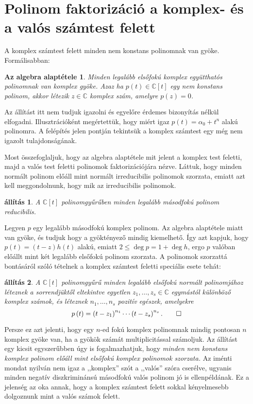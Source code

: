 \documentclass[9pt, a4paper, showtrims]{memoir}
\makeatletter
\renewenvironment{proof}[1][\proofname]
    {\par\pushQED{\qed}%
    \normalfont \topsep6\p@\@plus6\p@\relax
    \trivlist
    \item[\hskip\labelsep
        \itshape
    #1\@addpunct{:}]\ignorespaces}
    {\popQED\endtrivlist\@endpefalse}
\theoremstyle{plain}
\newtheorem{proposition}{állítás}[chapter]
\newtheorem*{FA}{Az algebra alaptétele}
\theoremstyle{remark}
\theoremstyle{definition}
\makeatother
\begin{document}
\section{Polinom faktorizáció a komplex- és a valós számtest felett}
A komplex számtest felett minden nem konstans polinomnak van gyöke.
Formálisabban:
\begin{FA}
	Minden legalább elsőfokú komplex együtthatós polinomnak van komplex gyöke.
	Azaz
	ha $p\left( t \right)\in\mathbb{C}[t]$ egy nem konstans polinom,
	akkor létezik $z\in\mathbb{C}$ komplex szám,
	amelyre $p\left( z \right)=0$.
\end{FA}
Az állítást itt nem tudjuk igazolni és egyelőre érdemes bizonyítás nélkül elfogadni.
Illusztrációként megértettük, hogy miért igaz $p\left( t \right)=\alpha_0+t^n$ alakú polinomra.
A felépítés jelen pontján tekintsük a komplex számtest egy még nem igazolt tulajdonságának.

Most összefoglaljuk, hogy az algebra alaptétele mit jelent a komplex test feletti, majd a valós test feletti polinomok
faktorizációjára nézve.
Láttuk, hogy minden normált polinom előáll mint normált irreducibilis polinomok szorzata,
emiatt azt kell meggondolnunk, hogy mik az irreducibilis polinomok.
\begin{proposition}
	A $\mathbb{C}\left[ t \right]$ polinomgyűrűben minden legalább másodfokú polinom reducibilis.
\end{proposition}
\begin{proof}
	Legyen $p$ egy legalább másodfokú komplex polinom.
	Az algebra alaptétele miatt van gyöke, és
	tudjuk hogy a gyöktényező mindig kiemelhető.
	Így azt kapjuk, hogy $p(t)=\left( t-z \right)h\left( t \right)$ alakú,
	emiatt $2\leq\deg p=1+\deg h$, ergo
	$p$ valóban előállt mint két legalább elsőfokú polinom szorzata.
\end{proof}
A polinomok szorzattá bontásáról szóló tételnek a komplex számtest feletti speciális esete tehát:
\begin{proposition}\label{pr:PolFact}
	A $\mathbb{C}[t]$ polinomgyűrű minden legalább elsőfokú normált polinomjához léteznek
	a sorrendjüktől eltekintve egyetlen $z_1,\ldots,z_s\in\mathbb{C}$ egymástól különböző komplex számok,
	és léteznek $n_1,\ldots,n_s$ pozitív egészek,
	amelyekre
	\[
		p\left( t \right)=
		\left( t-z_1 \right)^{n_1}
		\cdots
		\left( t-z_s\right)^{n_s}.\qedhere
	\]
\end{proposition}
Persze ez azt jelenti, hogy egy $n$-ed fokú komplex polinomnak mindig pontosan $n$ komplex gyöke van,
ha a gyökök számát multiplicitással számoljuk.
Az állítást egy kicsit egyszerűbben úgy is fogalmazhatjuk,
hogy
\emph{
	minden nem konstans komplex polinom előáll mint elsőfokú komplex polinomok szorzata.
}
Az iménti mondat nyilván nem igaz a ,,komplex'' szót a ,,valós'' szóra cserélve,
ugyanis minden negatív diszkriminánsú másodfokú valós polinom jó is ellenpéldának.
Ez a jelenség az oka annak,
hogy a komplex számtest felett sokkal kényelmesebb dolgoznunk mint a valós számok felett.
\end{document}
